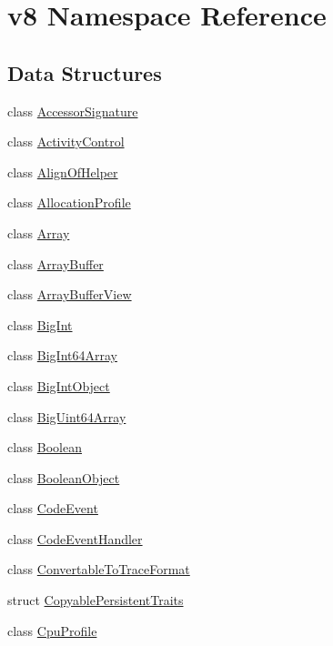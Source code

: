 \hypertarget{namespacev8}{}\section{v8 Namespace Reference}
\label{namespacev8}
\subsection*{Data Structures}
\begin{DoxyCompactItemize}
\item 
class \mbox{\hyperlink{classv8_1_1AccessorSignature}{Accessor\+Signature}}
\item 
class \mbox{\hyperlink{classv8_1_1ActivityControl}{Activity\+Control}}
\item 
class \mbox{\hyperlink{classv8_1_1AlignOfHelper}{Align\+Of\+Helper}}
\item 
class \mbox{\hyperlink{classv8_1_1AllocationProfile}{Allocation\+Profile}}
\item 
class \mbox{\hyperlink{classv8_1_1Array}{Array}}
\item 
class \mbox{\hyperlink{classv8_1_1ArrayBuffer}{Array\+Buffer}}
\item 
class \mbox{\hyperlink{classv8_1_1ArrayBufferView}{Array\+Buffer\+View}}
\item 
class \mbox{\hyperlink{classv8_1_1BigInt}{Big\+Int}}
\item 
class \mbox{\hyperlink{classv8_1_1BigInt64Array}{Big\+Int64\+Array}}
\item 
class \mbox{\hyperlink{classv8_1_1BigIntObject}{Big\+Int\+Object}}
\item 
class \mbox{\hyperlink{classv8_1_1BigUint64Array}{Big\+Uint64\+Array}}
\item 
class \mbox{\hyperlink{classv8_1_1Boolean}{Boolean}}
\item 
class \mbox{\hyperlink{classv8_1_1BooleanObject}{Boolean\+Object}}
\item 
class \mbox{\hyperlink{classv8_1_1CodeEvent}{Code\+Event}}
\item 
class \mbox{\hyperlink{classv8_1_1CodeEventHandler}{Code\+Event\+Handler}}
\item 
class \mbox{\hyperlink{classv8_1_1ConvertableToTraceFormat}{Convertable\+To\+Trace\+Format}}
\item 
struct \mbox{\hyperlink{structv8_1_1CopyablePersistentTraits}{Copyable\+Persistent\+Traits}}
\item 
class \mbox{\hyperlink{classv8_1_1CpuProfile}{Cpu\+Profile}}
\item 

\end{DoxyCompactItemize}
